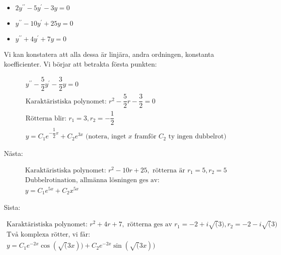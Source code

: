 \begin{itemize}
  \item $2y^{\prime\prime}-5y^{\prime}-3y=0$
  \item $y^{\prime\prime}-10y^{\prime}+25y=0$
  \item $y^{\prime\prime}+4y^{\prime}+7y=0$
\end{itemize}
\par\bigskip
\noindent Vi kan konstatera att alla dessa är linjära, andra ordningen, konstanta koefficienter. Vi börjar att betrakta första punkten:


\begin{equation*}
  \begin{gathered}
    y^{\prime\prime}-\dfrac{5}{2}y^{\prime}-\dfrac{3}{2}y=0\\
    \text{Karaktäristiska polynomet: } r^2-\dfrac{5}{2}r-\dfrac{3}{2}=0\\
    \text{Rötterna blir: } r_1=3, r_2=-\dfrac{1}{2}\\
    y=C_1e^{-\dfrac{1}{2}x}+C_2e^{3x} \text{ (notera, inget $x$ framför $C_2$ ty ingen dubbelrot)}
  \end{gathered}
\end{equation*}
\par\bigskip
\noindent Nästa:


\begin{equation*}
  \begin{gathered}
    \text{Karaktäristiska polynomet: } r^2-10r+25, \text{ rötterna är } r_1 = 5, r_2=5\\
    \text{Dubbelrotination, allmänna lösningen ges av: }\\
    y = C_1e^{5x}+C_2x^{5x}
  \end{gathered}
\end{equation*}
\par\bigskip
\noindent Sista:


\begin{equation*}
  \begin{gathered}
    \text{Karaktäristiska polynomet: } r^2+4r+7, \text{ rötterna ges av } r_1=-2+i\sqrt(3), r_2=-2-i\sqrt(3)\\
    \text{Två komplexa rötter, vi får: }\\
    y=C_1e^{-2x}\cos(\sqrt(3x))+C_2e^{-2x}\sin(\sqrt(3x))
  \end{gathered}
\end{equation*}











